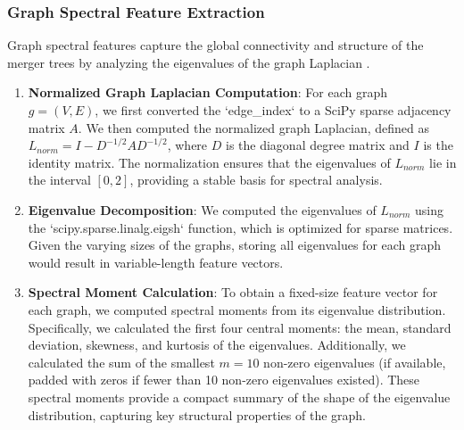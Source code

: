 \documentclass[twocolumn]{aastex631}
\begin{document}
\subsubsection{Graph Spectral Feature Extraction}
Graph spectral features capture the global connectivity and structure of the merger trees by analyzing the eigenvalues of the graph Laplacian \citep{desouza2023graphbasedspectralclassificationtype,pavlou2023graphtheoreticalanalysislocal}.
\begin{enumerate}
    \item \textbf{Normalized Graph Laplacian Computation}: For each graph $g = (V, E)$, we first converted the `edge_index` to a SciPy sparse adjacency matrix $A$. We then computed the normalized graph Laplacian, defined as $L_{norm} = I - D^{-1/2} A D^{-1/2}$, where $D$ is the diagonal degree matrix and $I$ is the identity matrix. The normalization ensures that the eigenvalues of $L_{norm}$ lie in the interval $[0, 2]$, providing a stable basis for spectral analysis.
    \item \textbf{Eigenvalue Decomposition}: We computed the eigenvalues of $L_{norm}$ using the `scipy.sparse.linalg.eigsh` function, which is optimized for sparse matrices. Given the varying sizes of the graphs, storing all eigenvalues for each graph would result in variable-length feature vectors.
    \item \textbf{Spectral Moment Calculation}: To obtain a fixed-size feature vector for each graph, we computed spectral moments from its eigenvalue distribution. Specifically, we calculated the first four central moments: the mean, standard deviation, skewness, and kurtosis of the eigenvalues. Additionally, we calculated the sum of the smallest $m=10$ non-zero eigenvalues (if available, padded with zeros if fewer than 10 non-zero eigenvalues existed). These spectral moments provide a compact summary of the shape of the eigenvalue distribution, capturing key structural properties of the graph.
\end{enumerate}
\end{document}

